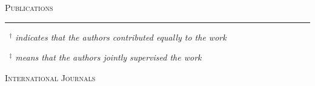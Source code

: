 \documentclass[a4paper,10pt]{article}
\newcommand{\mediumtitle}[1]{
	\vspace{0.2cm}
	{\noindent
	\Large \textsc{#1}\\[-2ex]
	\hrule
	\vspace{0.2cm}}
}
\newcommand{\smalltitle}[1]{
	\vspace{0.1cm}
	{\noindent 
	\large \textsc{#1}}
	\vspace{0.1cm}
}
\begin{document}
\newpage


\mediumtitle{Publications}

%
%
%

{\small 
\noindent \emph{~$^{\textbf{$\dag $}}$ indicates that the authors contributed equally to the work}

\noindent \emph{~$^{\textbf{$\ddag $}}$ means that the authors jointly supervised the work}
}

\vspace{0.4cm}

\smalltitle{International Journals}
\end{document}
